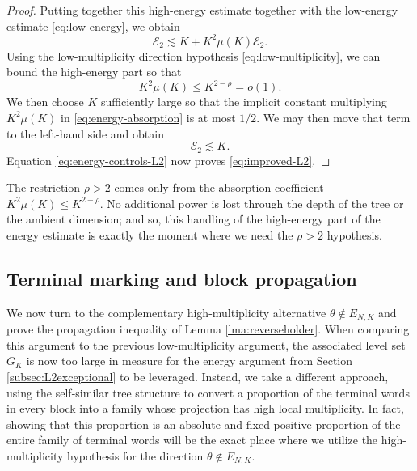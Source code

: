 \documentclass[12pt]{amsart}
\numberwithin{equation}{section}
\begin{document}
\begin{proof}
Putting together this high-energy estimate together with the low-energy estimate \eqref{eq:low-energy}, we obtain
\begin{equation}\label{eq:energy-absorption}
 \mathcal E_2
 \lesssim K+K^2\mu(K)\mathcal E_2.
\end{equation}
Using the low-multiplicity direction hypothesis \eqref{eq:low-multiplicity}, we can bound the high-energy part so that
\[
 K^2\mu(K)\leq K^{2-\rho}=o(1).
\]
We then choose $K$ sufficiently large so that the implicit constant multiplying $K^2\mu(K)$ in \eqref{eq:energy-absorption} is at most $1/2$.  We may then move that term to the left-hand side and obtain
\[
 \mathcal E_2\lesssim K.
\]
Equation \eqref{eq:energy-controls-L2} now proves \eqref{eq:improved-L2}.
\end{proof}

\begin{remark}
The restriction $\rho>2$ comes only from the absorption coefficient
$K^2\mu(K)\leq K^{2-\rho}$.  No additional power is lost through the depth
of the tree or the ambient dimension; and so, this handling of the high-energy part of the energy estimate is exactly the moment where we need the $\rho > 2$ hypothesis.
\end{remark}

\subsection{Terminal marking and block propagation}\label{subsec:reverseholder}

We now turn to the complementary high-multiplicity alternative
$\theta\notin E_{N,K}$ and prove the propagation inequality of Lemma
\ref{lma:reverseholder}.  When comparing this argument to the previous low-multiplicity argument, the associated level set $G_K$ is now too large in measure
for the energy argument from Section \ref{subsec:L2exceptional} to be leveraged. Instead, we take a different approach,
using the self-similar tree structure to convert a proportion of the
terminal words in every block into a family whose projection has high local
multiplicity. In fact, showing that this proportion is an absolute and fixed positive proportion of the entire family of terminal words will be the exact place where we utilize the high-multiplicity hypothesis for the direction $\theta \not\in E_{N,K}$.
\end{document}
